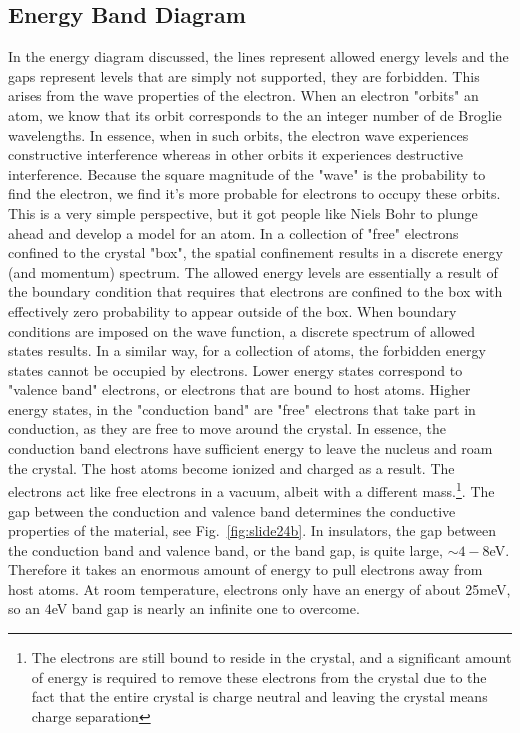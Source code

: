 \subsection{Energy Band Diagram}
In the energy diagram discussed, the lines represent allowed energy levels and the gaps represent levels that are simply not supported, they are forbidden.  This arises from the wave properties of the electron.  When an electron "orbits" an atom, we know that its orbit corresponds to the an integer number of de Broglie wavelengths.  In essence, when in such orbits, the electron wave experiences constructive interference whereas in other orbits it experiences destructive interference.  Because the square magnitude of the "wave" is the probability to find the electron, we find it's more probable for electrons to occupy these orbits.  This is a very simple perspective, but it got people like Niels Bohr to plunge ahead and develop a model for an atom.   In a collection of "free" electrons confined to the crystal "box", the spatial confinement results in a discrete energy (and momentum) spectrum.  The allowed energy levels are essentially a result of the boundary condition that requires that electrons are confined to the box with effectively zero probability to appear outside of the box.  When boundary conditions are imposed on the wave function, a discrete spectrum of allowed states results. 
In a similar way, for a collection of atoms, the forbidden energy states cannot be occupied by electrons.    Lower energy states correspond to "valence band" electrons, or electrons that are bound to host atoms.  Higher energy states, in the "conduction band" are "free" electrons that take part in conduction, as they are free to move around the crystal.  In essence, the conduction band electrons have sufficient energy to leave the nucleus and roam the crystal.  The host atoms become ionized and charged as a result.   The electrons act like free electrons in a vacuum, albeit with a different mass.\footnote{The electrons are still bound to reside in the crystal, and a significant amount of energy is required to remove these electrons from the crystal due to the fact that the entire crystal is charge neutral and leaving the crystal means charge separation}. 
The gap between the conduction and valence band determines the conductive properties of the material, see Fig.~\ref{fig:slide24b}.  In insulators, the gap between the conduction band and  valence band, or the band gap, is quite large,  $\sim 4-8$eV.  Therefore it takes an enormous amount of energy to pull electrons away from host atoms.  At room temperature, electrons only have an energy of about 25meV, so an $4$eV band gap is nearly an infinite one to overcome. 
